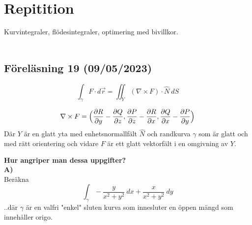 \documentclass{report}
\begin{document}
\pagebreak
\chapter{Repitition}
Kurvintegraler, flödesintegraler, optimering med bivillkor.\\\\


\section{Föreläsning 19 (09/05/2023)}

{
\begin{equation*}
	\int_{ \gamma}^{} F \cdot d \vec{r} = \iint_{Y} ( \nabla \times F ) \cdot \hat{N} \: dS 
\end{equation*}

\begin{equation*}
\nabla \times F = \Bigl( \frac{\partial R }{\partial y } - \frac{\partial Q }{\partial z } , \frac{\partial P }{\partial z } - \frac{\partial R }{\partial x } , \frac{\partial Q }{\partial x} - \frac{\partial P }{\partial y }  \Bigr) 
\end{equation*}
Där $ Y $ är en glatt yta med enhetsnormallfält $ \hat{N} $ och randkurva $ \gamma $ som är glatt och med rätt orientering och vidare $ F $ är ett glatt vektorfält i en omgivning av $ Y $.
}


\noindent
\textbf{Hur angriper man dessa uppgifter?}\\
\textbf{A)}\\
Beräkna
\begin{equation*}
\int_{ \gamma}^{} - \frac{y}{x^2+y^2}  \: dx + \frac{x}{x^2+y^2} \: dy 
\end{equation*}
..där $ \gamma $ är en valfri "enkel" sluten kurva som innesluter en öppen mängd som innehåller origo.\\\\
\end{document}
